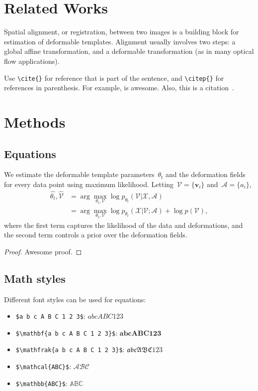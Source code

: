 \documentclass[twoside,11pt]{article}
\begin{document}
\section{Related Works}

Spatial alignment, or registration, between two images is a building block for estimation of deformable templates. Alignment usually involves two steps: a global affine transformation, and a deformable transformation (as in many optical flow applications).

Use \verb|\cite{}| for reference that is part of the sentence, and \verb|\citep{}| for references in parenthesis. For example, \cite{viola1997alignment} is awesome. Also, this is a citation~\citep{viola1997alignment}.



\section{Methods}

\subsection{Equations}

We estimate the deformable template parameters~$\theta_t$ and the deformation fields for every data point using maximum likelihood. Letting~$\mathcal{V} = \{\boldsymbol{v}_i\}$ and~$\mathcal{A} = \{a_i\}$,
%
\begin{align}
\hat{\theta_t}, \hat{\mathcal{V}} &= \arg \max_{\theta_t, \mathcal{V}} \log p_{\theta_t}(\mathcal{V} | \mathcal{X},  \mathcal{A}) \nonumber \\
&= \arg \max_{\theta_t, \mathcal{V}} \log p_{\theta_t}(\mathcal{X} | \mathcal{V}; \mathcal{A}) + \log p(\mathcal{V}),
\label{eq:logpost}
\end{align}
%
where the first term captures the likelihood of the data and deformations, and the second term controls a prior over the deformation fields.

\begin{proof}
    Awesome proof.
\end{proof}

\subsection{Math styles}
Different font styles can be used for equations:
\begin{itemize}
	\item \verb|$a b c A B C 1 2 3$|: $ a b c A B C 1 2 3 $
	\item \verb|$\mathbf{a b c A B C 1 2 3}$|: $ \mathbf{a b c A B C 1 2 3} $
	\item \verb|$\mathfrak{a b c A B C 1 2 3}$|: $ \mathfrak{a b c A B C 1 2 3} $
	\item \verb|$\mathcal{ABC}$|: $ \mathcal{ABC} $
	\item \verb|$\mathbb{ABC}$|: $ \mathbb{ABC} $
\end{itemize}
\end{document}
